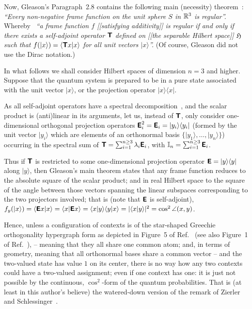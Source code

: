 Now, Gleason's Paragraph~2.8 contains the following main (necessity) theorem~\cite[p.~888]{Gleason}:
{\em ``Every non-negative frame function on the unit sphere $S$ in ${\Bbb R}^3$
is regular''.}
Whereby~\cite[p.~886]{Gleason}
{\em ``a frame function $f$ [[satisfying additivity]]
is regular if and only if there exists a self-adjoint
operator $\textsf{\textbf{T}}$ defined on [[the separable Hilbert space]] $\mathfrak{H}$ such that
$f( \vert x \rangle ) = \langle \textsf{\textbf{T}}x \vert x\rangle$ for all unit vectors $ \vert x \rangle $''.}
(Of course, Gleason did not use the Dirac notation.)

In what follows we shall consider Hilbert spaces of dimension $n=3$ and higher.
Suppose that the quantum system is prepared to be in a
pure state associated with the unit vector $\vert x \rangle$,
or the projection operator $\vert x \rangle \langle x \vert$.

As all self-adjoint operators have a spectral decomposition~\cite[{\S}~79]{halmos-vs},
and the scalar product is (anti)linear in its arguments,
let us, instead of $\textsf{\textbf{T}}$, only consider one-dimensional orthogonal projection operators
$\textsf{\textbf{E}}_i^2=\textsf{\textbf{E}}_i = \vert y_i \rangle \langle y_i \vert$
(formed by the unit vector $ \vert y_i \rangle $ which are elements of an orthonormal basis
$\{  \vert y_1 \rangle , \ldots ,  \vert y_n \rangle \}$)
occurring in the spectral sum of
$\textsf{\textbf{T}}=\sum_{i=1}^{n\ge 3} \lambda_i \textsf{\textbf{E}}_i$,
with
${\Bbb I}_n =\sum_{i=1}^{n\ge 3} \textsf{\textbf{E}}_i$.

Thus if $\textsf{\textbf{T}}$ is restricted to some one-dimensional projection operator
$\textsf{\textbf{E}} = \vert y \rangle \langle y \vert$ along $\vert y \rangle $,
then Gleason's main theorem
states that any frame function
reduces to the absolute square of the scalar product;
and in real Hilbert space to the square of the angle between those vectors spanning the linear subspaces corresponding to the two projectors involved;
that is (note that $\textsf{\textbf{E}}$ is self-adjoint),
$f_y( \vert x \rangle ) =
\langle \textsf{\textbf{E}}x \vert x\rangle  =
\langle x \vert \textsf{\textbf{E}} x\rangle  =
\langle x \vert y \rangle \langle y \vert x\rangle  =
\vert \langle x \vert y \rangle
\vert^2 = \cos^2 \angle (x,y)$.

Hence, unless a configuration of contexts is of the star-shaped Greechie orthogonality hypergraph form
as depicted in Figure~5 of Ref.~\cite{PhysRevA.89.032109} (see also Figure~1 of Ref.~\cite{svozil-2013-omelette}),
--
meaning that they all share one common atom; and,
in terms of geometry, meaning that all orthonormal bases share a common vector
--
and the two-valued state has value $1$ on its center,
there is no way how any two contexts could have a two-valued assignment;
even if one context has one: it is just not possible by the continuous, $\cos^2$-form
of the quantum probabilities.
That is (at least in this author's believe) the watered-down version of the remark of Zierler and Schlessinger~\cite[p.~259, Example~3.2]{ZirlSchl-65}.



